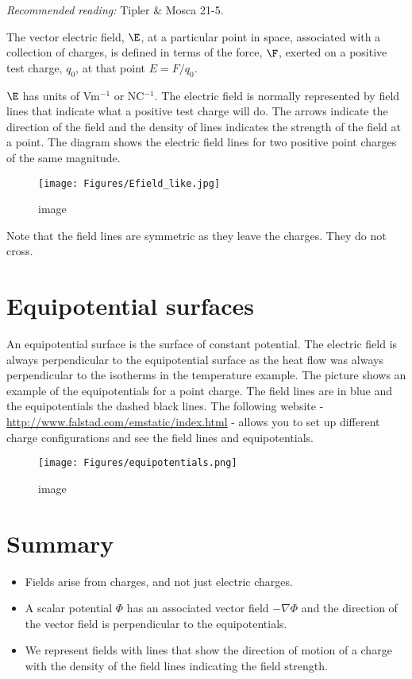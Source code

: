 \documentclass[
]{book}
\theoremstyle{definition}
\theoremstyle{definition}
\theoremstyle{definition}
\theoremstyle{definition}
\theoremstyle{remark}
\begin{document}
\emph{Recommended reading:} Tipler \& Mosca 21-5.

The vector electric field, \(\E\), at a particular point in space,
associated with a collection of charges, is defined in terms of the
force, \(\F\), exerted on a positive test charge, \(q_0\), at that point
\(E = F/q_0\).

\(\E\) has units of Vm\(^{-1}\) or NC\(^{-1}\). The electric field is normally
represented by field lines that indicate what a positive test charge
will do. The arrows indicate the direction of the field and the density
of lines indicates the strength of the field at a point. The diagram
shows the electric field lines for two positive point charges of the
same magnitude.

\begin{figure}
\centering
\texttt{[image: Figures/Efield\_like.jpg]}
\caption{image}
\end{figure}

Note that the field lines are symmetric as they leave the charges. They
do not cross.

\hypertarget{equipotential-surfaces}{%
\section{Equipotential surfaces}\label{equipotential-surfaces}}

An equipotential surface is the surface of constant potential. The
electric field is always perpendicular to the equipotential surface as
the heat flow was always perpendicular to the isotherms in the
temperature example. The picture shows an example of the equipotentials
for a point charge. The field lines are in blue and the equipotentials
the dashed black lines. The following website -
\url{http://www.falstad.com/emstatic/index.html} - allows you to set up
different charge configurations and see the field lines and
equipotentials.

\begin{figure}
\centering
\texttt{[image: Figures/equipotentials.png]}
\caption{image}
\end{figure}

\hypertarget{summary}{%
\section{Summary}\label{summary}}

\begin{itemize}
\item
  Fields arise from charges, and not just electric charges.
\item
  A scalar potential \(\Phi\) has an associated vector field
  \(-\nabla \Phi\) and the direction of the vector field is
  perpendicular to the equipotentials.
\item
  We represent fields with lines that show the direction of motion of
  a charge with the density of the field lines indicating the field
  strength.
\end{itemize}
\end{document}
